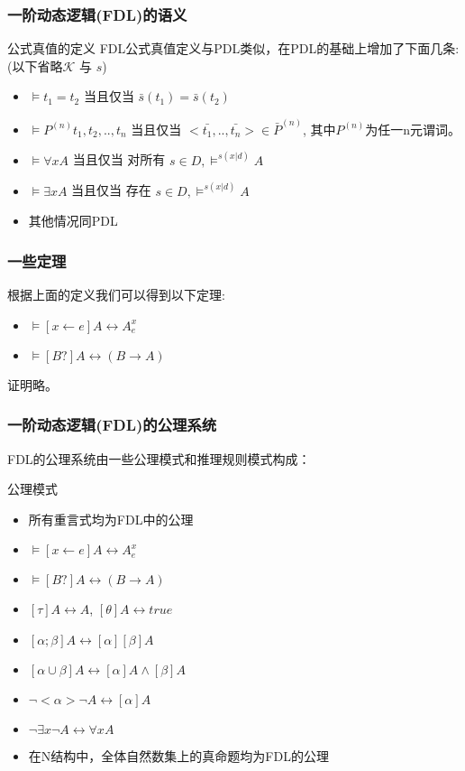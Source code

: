 \documentclass{beamer}
\begin{document}
\begin{frame}
	\frametitle{一阶动态逻辑(FDL)的语义}
	\begin{block}{公式真值的定义}
	FDL公式真值定义与PDL类似，在PDL的基础上增加了下面几条:
	(以下省略$\mathcal{K}$ 与 $s$)
		\begin{itemize}
			\item $\models t_1 = t_2$ 当且仅当 $\bar{s}(t_1) = \bar{s}(t_2)$
			\item $\models P^{(n)} t_1, t_2 ,.., t_n$ 当且仅当 $<\bar{t_1},..,\bar{t_n}> \in \bar{P}^{(n)}$, 其中$P^{(n)}$为任一n元谓词。
			\item $\models \forall xA $ 当且仅当 对所有 $s \in D, \models ^{s(x|d)} A$
			\item $\models \exists xA $ 当且仅当 存在 $s \in D, \models ^{s(x|d)} A$
			\item 其他情况同PDL
		\end{itemize}
	\end{block}
\end{frame}



\begin{frame}
	\frametitle{一些定理}
	根据上面的定义我们可以得到以下定理:
	\begin{block}{}
		\begin{itemize}
	    	\item $\models [x \leftarrow e]A \leftrightarrow A^{x}_{e} $
	    	\item $\models [B?]A \leftrightarrow (B \rightarrow A) $
		\end{itemize}
		证明略。
	\end{block}
\end{frame}


\begin{frame}
	\frametitle{一阶动态逻辑(FDL)的公理系统}
	FDL的公理系统由一些公理模式和推理规则模式构成：
	\begin{block}{公理模式}
		\begin{itemize}
			\item 所有重言式均为FDL中的公理
			\item $\models [x \leftarrow e]A \leftrightarrow A^{x}_{e} $
			\item $\models [B?]A \leftrightarrow (B \rightarrow A) $
			\item $[\tau]A \leftrightarrow A$, $[\theta]A \leftrightarrow true $
			\item $[\alpha ; \beta]A \leftrightarrow [\alpha][\beta]A $
			\item $[\alpha \cup \beta]A \leftrightarrow [\alpha]A \wedge [\beta]A $
			\item $\neg <\alpha> \neg A \leftrightarrow [\alpha]A $
			\item $\neg \exists x \neg A \leftrightarrow \forall xA$
			\item 在N结构中，全体自然数集上的真命题均为FDL的公理
		\end{itemize}
	\end{block}
\end{frame}
\end{document}
